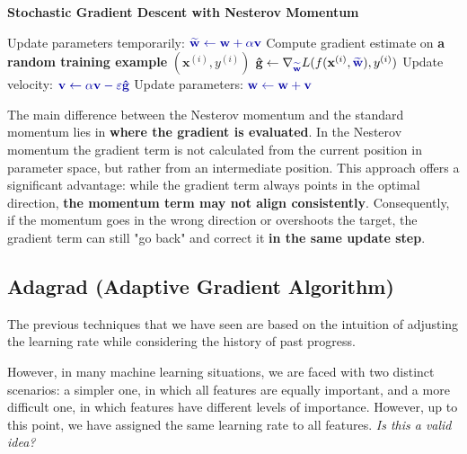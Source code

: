 \begin{algorithm}
\renewcommand\thealgorithm{}
\caption{\textbf{\textcolor{mygreen}{Stochastic Gradient Descent with Nesterov Momentum}}}
\begin{algorithmic}[1]
\STATE Update parameters temporarily:
$\textcolor{mybluee}{\widetilde{\mathbf{w}} \leftarrow \mathbf{w} + \alpha \mathbf{v}}$
\STATE Compute gradient estimate on \textbf{\textcolor{myred}{a random training example}} $(\mathbf{x}^{(i)}, y^{(i)})$
\STATE $\mathbf{\hat{g}} \leftarrow \nabla_{\textcolor{mybluee}{\widetilde{\mathbf{w}}}} L(f(\mathbf{x}^{(i)},\textcolor{mybluee}{\widetilde{\mathbf{w}}}), y^{(i)})$
\STATE Update velocity:
$\textcolor{mybluee}{\mathbf{v} \leftarrow \alpha \mathbf{v} - \varepsilon \mathbf{\hat{g}}}$
\STATE Update parameters:
$\textcolor{mybluee}{\mathbf{w} \leftarrow \mathbf{w} + \mathbf{v}}$
\ENDWHILE
\end{algorithmic}
\end{algorithm}

The main difference between the Nesterov momentum and the standard momentum lies in \textbf{where the gradient is evaluated}. In the Nesterov momentum the gradient term is not calculated from the current position in parameter space, but rather from an intermediate position. This approach offers a significant advantage: while the gradient term always points in the optimal direction, \textbf{the momentum term may not align consistently}. Consequently, if the momentum goes in the wrong direction or overshoots the target, the gradient term can still "go back" and correct it \textbf{in the same update step}.

\newpage
\subsection{Adagrad (Adaptive Gradient Algorithm)}
The previous techniques that we have seen are based on the intuition of adjusting the learning rate while considering the history of past progress.

However, in many machine learning situations, we are faced with two distinct scenarios: a simpler one, in which all features are equally important, and a more difficult one, in which features have different levels of importance. However, up to this point, we have assigned the same learning rate to all features. \textit{Is this a valid idea?}

